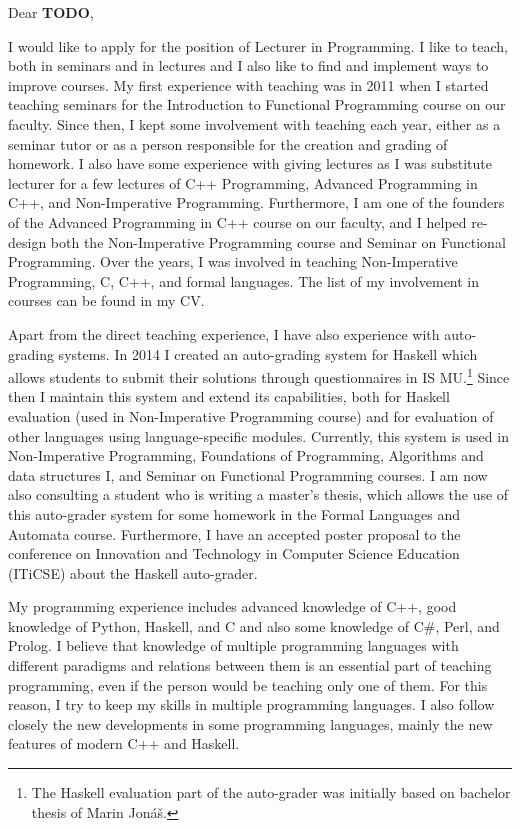 \documentclass[11pt,a4paper]{article}
\newcommand{\TODO}[1]{{\bf\color{red}#1}}
\begin{document}
Dear \TODO{TODO},

\smallskip
I would like to apply for the position of Lecturer in Programming.
I like to teach, both in seminars and in lectures and I also like to find and implement ways to improve courses.
My first experience with teaching was in 2011 when I started teaching seminars for the Introduction to Functional Programming course on our faculty.
Since then, I kept some involvement with teaching each year, either as a seminar tutor or as a person responsible for the creation and grading of homework.
I also have some experience with giving lectures as I was substitute lecturer for a few lectures of C++ Programming, Advanced Programming in C++, and Non-Imperative Programming.
Furthermore, I am one of the founders of the Advanced Programming in C++ course on our faculty, and I helped re-design both the Non-Imperative Programming course and Seminar on Functional Programming.
Over the years, I was involved in teaching Non-Imperative Programming, C, C++, and formal languages.
The list of my involvement in courses can be found in my CV.

Apart from the direct teaching experience, I have also experience with auto-grading systems.
In 2014 I created an auto-grading system for Haskell which allows students to submit their solutions through questionnaires in IS MU.\footnote{The Haskell evaluation part of the auto-grader was initially based on bachelor thesis of Marin Jonáš.}
Since then I maintain this system and extend its capabilities, both for Haskell evaluation (used in Non-Imperative Programming course) and for evaluation of other languages using language-specific modules.
Currently, this system is used in Non-Imperative Programming, Foundations of Programming, Algorithms and data structures I, and Seminar on Functional Programming courses.
I am now also consulting a student who is writing a master's thesis, which allows the use of this auto-grader system for some homework in the Formal Languages and Automata course.
Furthermore, I have an accepted poster proposal to the conference on Innovation and Technology in Computer Science Education (ITiCSE) about the Haskell auto-grader.

My programming experience includes advanced knowledge of C++, good knowledge of Python, Haskell, and C and also some knowledge of C\#, Perl, and Prolog.
I believe that knowledge of multiple programming languages with different paradigms and relations between them is an essential part of teaching programming, even if the person would be teaching only one of them.
For this reason, I try to keep my skills in multiple programming languages.
I also follow closely the new developments in some programming languages, mainly the new features of modern C++ and Haskell.
\end{document}

